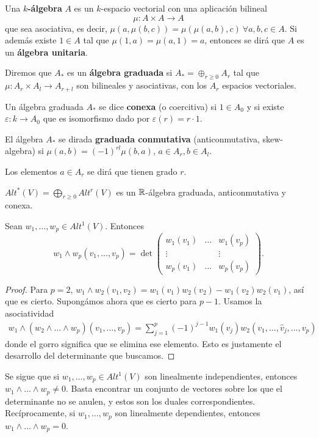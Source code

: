 \documentclass[CV.tex]{subfiles}
\begin{document}
\begin{defi}
Una \textbf{$k$-álgebra} $A$ es un $k$-espacio vectorial con una aplicación bilineal 
$$\mu:A\times A\to A$$
que sea asociativa, es decir, $\mu(a,\mu(b,c))=\mu(\mu(a,b),c)\ \forall a,b,c\in A$. Si además existe $1\in A$ tal que $\mu(1,a)=\mu(a,1)=a$, entonces se dirá que $A$ es un \textbf{álgebra unitaria}.

Diremos que $A_*$ es un \textbf{álgebra graduada} si $A_*=\oplus_{r\geq 0}A_r$ tal que $\mu:A_r\times A_l\to A_{r+l}$ son bilineales y asociativas, con los $A_r$ espacios vectoriales.

Un álgebra graduada $A_*$ se dice \textbf{conexa} (o coercitiva) si $1\in A_0$ y si existe $\varepsilon:k\to A_0$ que es isomorfismo dado por $\varepsilon(r)=r\cdot 1$.

El álgebra $A_*$ se dirada \textbf{graduada conmutativa} (anticonmutativa, skew-algebra) si $\mu(a,b)=(-1)^{rl}\mu(b,a)$, $a\in A_r,b\in A_l$. 
\end{defi}
\begin{nota} Los elementos $a\in A_r$ se dirá que tienen grado $r$.
\end{nota}

\begin{teorema}
$Alt^*(V)=\bigoplus_{r\geq 0} Alt^r(V)$ es un $\mathbb{R}$-álgebra graduada, anticonmutativa y conexa.
\end{teorema}
\begin{lemma}
Sean $w_1,\dots, w_p\in Alt^1(V)$. Entonces 
$$w_1\land w_p(v_1,\dots, v_p)=\det\begin{pmatrix}
w_1(v_1) &\dots & w_1(v_p)\\
\vdots & & \vdots\\
w_p(v_1) & \dots & w_p(v_p)
\end{pmatrix}.$$
\end{lemma}
\begin{proof}
Para $p=2$, $w_1\land w_2(v_1,v_2)=w_1(v_1)w_2(v_2)-w_1(v_2)w_2(v_1)$, así que es cierto.
Supongámos ahora que es cierto para $p-1$. Usamos la asociatividad
\begin{gather*}
w_1\land (w_2\land\dots\land w_p)(v_1,\dots, v_p)=\sum_{j=1}^p(-1)^{j-1}w_1(v_j)w_2(v_1,\dots, \hat{v}_j,\dots, v_p)
\end{gather*}
donde el gorro significa que se elimina ese elemento. Esto es justamente el desarrollo del determinante que buscamos.
\end{proof}
Se sigue que si $w_1,\dots, w_p\in Alt^1(V)$ son linealmente independientes, entonces $w_1\land\dots\land w_p\neq 0$. Basta encontrar un conjunto de vectores sobre los que el determinante no se anulen, y estos son los duales correspondientes. Recíprocamente, si $w_1,\dots, w_p$ son linealmente dependientes, entonces $w_1\land\dots\land w_p=0$. 
\end{document}
